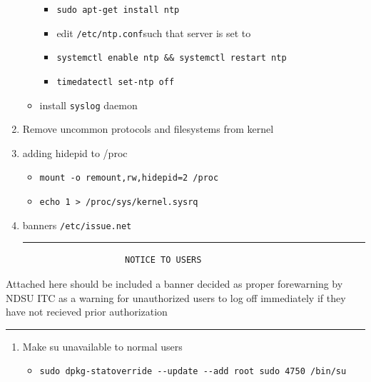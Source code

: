 \documentclass[12pt, letterpaper,oneocolumn]{article}
\begin{document}
\begin{appendices}
\begin{enumerate}
\begin{itemize}
    \begin{itemize}
    \item
      \texttt{sudo\ apt-get\ install\ ntp}
    \item
      edit \texttt{/etc/ntp.conf}such that server is set to
    \item
      \texttt{systemctl\ enable\ ntp\ \&\&\ systemctl\ restart\ ntp}
    \item
      \texttt{timedatectl\ set-ntp\ off}
    \end{itemize}
  \item
    install \texttt{syslog} daemon
  \end{itemize}
\item
  Remove uncommon protocols and filesystems from kernel
\item
  adding hidepid to /proc

  \begin{itemize}
  \item
    \texttt{mount\ -o\ remount,rw,hidepid=2\ /proc}
  \item
    \texttt{echo\ 1\ \textgreater{}\ /proc/sys/kernel.sysrq}
  \end{itemize}
\item
  banners \texttt{/etc/issue.net}

  \begin{center}\rule{0.5\linewidth}{0.5pt}\end{center}

\begin{verbatim}
                    NOTICE TO USERS
\end{verbatim}
\end{enumerate}

Attached here should be included a banner decided as proper forewarning
by NDSU ITC as a warning for unauthorized users to log off immediately
if they have not recieved prior authorization

\begin{center}\rule{0.5\linewidth}{0.5pt}\end{center}

\begin{enumerate}
\def\labelenumi{\arabic{enumi}.}
\setcounter{enumi}{16}
\item
  Make su unavailable to normal users

  \begin{itemize}
  \item
    \texttt{sudo\ dpkg-statoverride\ -\/-update\ -\/-add\ root\ sudo\ 4750\ /bin/su}
  \end{itemize}
\end{enumerate}


\end{appendices}
\end{document}
